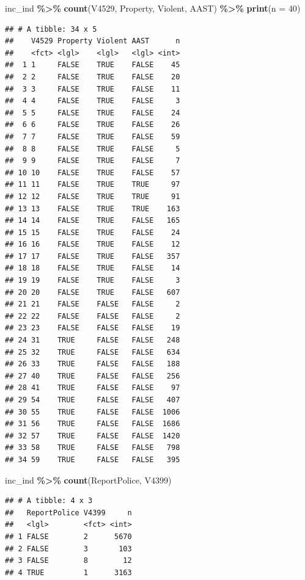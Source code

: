\documentclass[
]{krantz}
\makeatletter
\newenvironment{Shaded}{\begin{snugshade}}{\end{snugshade}}
\newcommand{\AttributeTok}[1]{\textcolor[rgb]{0.27,0.27,0.27}{#1}}
\newcommand{\DecValTok}[1]{\textcolor[rgb]{0.06,0.06,0.06}{#1}}
\newcommand{\FunctionTok}[1]{\textcolor[rgb]{0.27,0.27,0.27}{\textbf{#1}}}
\newcommand{\NormalTok}[1]{#1}
\newcommand{\SpecialCharTok}[1]{\textcolor[rgb]{0.43,0.43,0.43}{\textbf{#1}}}
\newenvironment{kframe}{%
\medskip{}
\setlength{\fboxsep}{.8em}
 \def\at@end@of@kframe{}%
 \ifinner\ifhmode%
  \def\at@end@of@kframe{\end{minipage}}%
  \begin{minipage}{\columnwidth}%
 \fi\fi%
 \def\FrameCommand##1{\hskip\@totalleftmargin \hskip-\fboxsep
 \colorbox{shadecolor}{##1}\hskip-\fboxsep
     \hskip-\linewidth \hskip-\@totalleftmargin \hskip\columnwidth}%
 \MakeFramed {\advance\hsize-\width
   \@totalleftmargin\z@ \linewidth\hsize
   \@setminipage}}%
 {\par\unskip\endMakeFramed%
 \at@end@of@kframe}
\renewenvironment{Shaded}{\begin{kframe}}{\end{kframe}}
\makeatother
\begin{document}
\begin{Shaded}
\begin{Highlighting}[]
\NormalTok{inc\_ind }\SpecialCharTok{\%\textgreater{}\%}
  \FunctionTok{count}\NormalTok{(V4529, Property, Violent, AAST) }\SpecialCharTok{\%\textgreater{}\%}
  \FunctionTok{print}\NormalTok{(}\AttributeTok{n =} \DecValTok{40}\NormalTok{)}
\end{Highlighting}
\end{Shaded}

\begin{verbatim}
## # A tibble: 34 x 5
##    V4529 Property Violent AAST      n
##    <fct> <lgl>    <lgl>   <lgl> <int>
##  1 1     FALSE    TRUE    FALSE    45
##  2 2     FALSE    TRUE    FALSE    20
##  3 3     FALSE    TRUE    FALSE    11
##  4 4     FALSE    TRUE    FALSE     3
##  5 5     FALSE    TRUE    FALSE    24
##  6 6     FALSE    TRUE    FALSE    26
##  7 7     FALSE    TRUE    FALSE    59
##  8 8     FALSE    TRUE    FALSE     5
##  9 9     FALSE    TRUE    FALSE     7
## 10 10    FALSE    TRUE    FALSE    57
## 11 11    FALSE    TRUE    TRUE     97
## 12 12    FALSE    TRUE    TRUE     91
## 13 13    FALSE    TRUE    TRUE    163
## 14 14    FALSE    TRUE    FALSE   165
## 15 15    FALSE    TRUE    FALSE    24
## 16 16    FALSE    TRUE    FALSE    12
## 17 17    FALSE    TRUE    FALSE   357
## 18 18    FALSE    TRUE    FALSE    14
## 19 19    FALSE    TRUE    FALSE     3
## 20 20    FALSE    TRUE    FALSE   607
## 21 21    FALSE    FALSE   FALSE     2
## 22 22    FALSE    FALSE   FALSE     2
## 23 23    FALSE    FALSE   FALSE    19
## 24 31    TRUE     FALSE   FALSE   248
## 25 32    TRUE     FALSE   FALSE   634
## 26 33    TRUE     FALSE   FALSE   188
## 27 40    TRUE     FALSE   FALSE   256
## 28 41    TRUE     FALSE   FALSE    97
## 29 54    TRUE     FALSE   FALSE   407
## 30 55    TRUE     FALSE   FALSE  1006
## 31 56    TRUE     FALSE   FALSE  1686
## 32 57    TRUE     FALSE   FALSE  1420
## 33 58    TRUE     FALSE   FALSE   798
## 34 59    TRUE     FALSE   FALSE   395
\end{verbatim}

\begin{Shaded}
\begin{Highlighting}[]
\NormalTok{inc\_ind }\SpecialCharTok{\%\textgreater{}\%} \FunctionTok{count}\NormalTok{(ReportPolice, V4399)}
\end{Highlighting}
\end{Shaded}

\begin{verbatim}
## # A tibble: 4 x 3
##   ReportPolice V4399     n
##   <lgl>        <fct> <int>
## 1 FALSE        2      5670
## 2 FALSE        3       103
## 3 FALSE        8        12
## 4 TRUE         1      3163
\end{verbatim}
\end{document}
